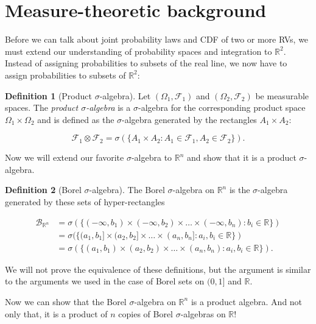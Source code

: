 \documentclass{book}
\theoremstyle{plain}%
\theoremstyle{definition}
\newtheorem{definition}{Definition}[section]
\begin{document}
\section{Measure-theoretic background}

Before we can talk about joint probability laws and CDF of two or more RVs, we must extend our understanding of probability spaces and integration to $\mathbb{R}^2$. Instead of assigning probabilities to subsets of the real line, we now have to assign probabilities to subsets of $\mathbb{R}^2$:

\begin{definition}[Product $\sigma$-algebra]
Let $(\Omega_1, \mathcal{F}_1)$ and $(\Omega_2, \mathcal{F}_2)$ be measurable spaces. The \emph{product $\sigma$-algebra} is a $\sigma$-algebra for the corresponding product space $\Omega_1 \times \Omega_2$ and is defined as the $\sigma$-algebra generated by the rectangles $A_1 \times A_2$:

$$\mathcal{F}_1 \otimes \mathcal{F}_2  = \sigma(\{A_1 \times A_2: A_1 \in \mathcal{F}_1, A_2 \in \mathcal{F}_2 \}).$$
\end{definition}

Now we will extend our favorite $\sigma$-algebra to $\mathbb{R}^n$ and show that it is a product $\sigma$-algebra.

\begin{definition}[Borel $\sigma$-algebra]
The Borel $\sigma$-algebra on $\mathbb{R}^n$ is the $\sigma$-algebra generated by these sets of hyper-rectangles

\begin{align*}
\mathcal{B}_{\mathbb{R}^n} &= \sigma(\{(-\infty, b_1) \times (-\infty, b_2) \times \hdots \times (-\infty, b_n) : b_i \in \mathbb{R}\})\\
 &= \sigma(\{(a_1, b_1] \times (a_2, b_2] \times \hdots \times (a_n, b_n] : a_i, b_i \in \mathbb{R}\})\\
&= \sigma(\{(a_1, b_1) \times (a_2, b_2) \times \hdots \times (a_n, b_n) : a_i, b_i \in \mathbb{R}\}).
\end{align*}

\end{definition}

We will not prove the equivalence of these definitions, but the argument is similar to the arguments we used in the case of Borel sets on $(0,1]$ and $\mathbb{R}$.

Now we can show that the Borel $\sigma$-algebra on $\mathbb{R}^n$ is a product algebra. And not only that, it is a product of $n$ copies of Borel $\sigma$-algebras on $\mathbb{R}$!
\end{document}
